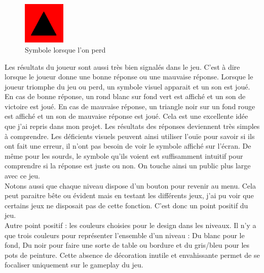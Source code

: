 \documentclass{article}
\begin{document}
\begin{figure}
  \vspace{-20pt}
  \begin{center}
    \includegraphics[width=0.18\textwidth]{5}
  \end{center}
  \vspace{-20pt}
  \caption{Symbole lorsque l'on perd}
  \vspace{-10pt}
\end{figure}

Les résultats du joueur sont aussi très bien signalés dans le jeu. C'est à dire lorsque le joueur donne une bonne réponse ou une mauvaise réponse. Lorsque le joueur triomphe du jeu ou perd, un symbole visuel apparait et un son est joué. En cas de bonne réponse, un rond blanc sur fond vert est affiché et un son de victoire est joué. En cas de mauvaise réponse, un triangle noir sur un fond rouge est affiché et un son de mauvaise réponse est joué. Cela est une excellente idée que j'ai repris dans mon projet. Les résultats des réponses deviennent très simples à comprendre. Les déficients visuels peuvent ainsi utiliser l'ouïe pour savoir si ils ont fait une erreur, il n'ont pas besoin de voir le symbole affiché sur l'écran. De même pour les sourds, le symbole qu'ils voient est suffisamment intuitif pour comprendre si la réponse est juste ou non. On touche ainsi un public plus large avec ce jeu.\\

Notons aussi que chaque niveau dispose d'un bouton pour revenir au menu. Cela peut paraitre bête ou évident mais en testant les différents jeux, j'ai pu voir que certains jeux ne disposait pas de cette fonction. C'est donc un point positif du jeu.\\

Autre point positif : les couleurs choisies pour le design dans les niveaux. Il n'y a que trois couleurs pour représenter l'ensemble d'un niveau : Du blanc pour le fond, Du noir pour faire une sorte de table ou bordure et du gris/bleu pour les pots de peinture. Cette absence de décoration inutile et envahissante permet de se focaliser uniquement sur le gameplay du jeu.

\newpage
\end{document}
